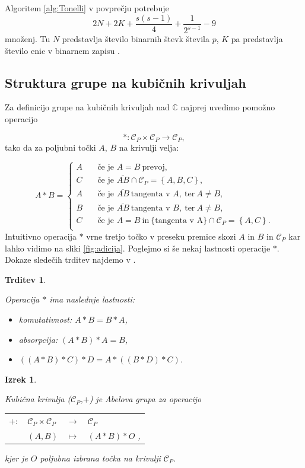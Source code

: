 \documentclass[12pt,a4paper,twoside]{article}
\theoremstyle{definition} %
\theoremstyle{plain} %
\newtheorem{izrek}[definicija]{Izrek}
\newtheorem{trditev}[definicija]{Trditev}
\numberwithin{equation}{section}  %
\renewcommand{\C}{\mathbb C}
\begin{document}
Algoritem \ref{alg:Tonelli} v povprečju potrebuje
$$2N+2K+\frac{s(s-1)}{4}+\frac{1}{2^{s-1}}-9$$
množenj. Tu $N$ predstavlja število binarnih števk števila $p$, $K$ pa predstavlja število enic v binarnem zapisu \cite{Tornaria2002}.

\subsection{Struktura grupe na kubičnih krivuljah}


Za definicijo grupe na kubičnih krivuljah nad $\C$ najprej uvedimo pomožno operacijo

$$\ast : \mathcal{C}_P \times \mathcal{C}_P \rightarrow \mathcal{C}_P,$$
tako da za poljubni točki $A$, $B$ na krivulji velja:

\[ A \ast B =
\begin{cases}
A & \quad \text{če je } A=B \ \text{prevoj},\\
C & \quad \text{če je } \overline{AB} \cap \mathcal{C}_P = \left\{ A,B,C \right\},\\
A & \quad \text{če je } \overline{AB} \ \text{tangenta v } A,\ \text{ter} \ A \neq B,\\
B & \quad \text{če je } \overline{AB} \ \text{tangenta v } B,\ \text{ter} \ A \neq B,\\
C &\quad \text{če je } A=B \  \text{in}\ \{\text{tangenta v A}\} \cap \mathcal{C}_P = \left\{ A,C \right\}.\\
\end{cases}
\]
Intuitivno operacija $\ast$ vrne tretjo točko v preseku premice skozi $A$ in $B$ in $\mathcal{C}_P$ kar lahko vidimo na sliki \ref{fig:adicija}. Poglejmo si še nekaj lastnosti operacije $\ast$. Dokaze sledečih trditev najdemo v \cite[Poglavje 17.3]{Gibson1999}.

\begin{trditev}~

\label{last zvezda}
Operacija $\ast$ ima naslednje lastnosti:

\begin{itemize}
\item komutativnost: $ A \ast B = B \ast A$,
\item absorpcija: $(A \ast B ) \ast A = B$,
\item $((A \ast B) \ast C ) \ast D = A \ast ((B \ast D)\ast C)$.
\end{itemize}
\end{trditev}

\begin{izrek}~

Kubična krivulja ($\mathcal{C}_P$,$+$) je Abelova grupa za operacijo

\begin{table}[ht]
\centering
\begin{tabular}{llll}
$+:$ & $\mathcal{C}_P \times \mathcal{C}_P$ & $\rightarrow$ & $\mathcal{C}_P$ \\
& $(A,B)$ & $\mapsto$ & $(A\ast B)\ast O$ ,
\end{tabular}
\end{table}
kjer je $O$ poljubna izbrana točka na krivulji $ \mathcal{C}_P$.
\end{izrek}
\end{document}
